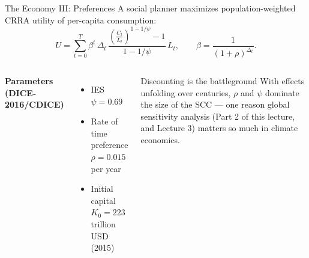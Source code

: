 \documentclass[aspectratio=169,11pt]{beamer}
\begin{document}
\begin{frame}{The Economy III: Preferences}
A social planner maximizes population-weighted CRRA utility of per-capita consumption:
\[
U = \sum_{t=0}^{T} \beta^{t}\, \Delta_t\,
\frac{\left(\frac{C_t}{L_t}\right)^{1-1/\psi} - 1}{1-1/\psi}\, L_t ,
\qquad
\beta = \frac{1}{(1+\rho)^{\Delta_t}} .
\]

\vspace{0.3cm}
\begin{columns}[T]
\textbf{Parameters (DICE-2016/CDICE)}
\begin{itemize}
    \item IES $\psi = 0.69$
    \item Rate of time preference $\rho = 0.015$ per year
    \item Initial capital $K_0 = 223$ trillion USD (2015)
\end{itemize}

\begin{block}{Discounting is the battleground}
With effects unfolding over centuries, $\rho$ and $\psi$ dominate the size of the SCC --- one reason global sensitivity analysis (Part 2 of this lecture, and Lecture 3) matters so much in climate economics.
\end{block}
\end{columns}
\end{frame}
\end{document}
